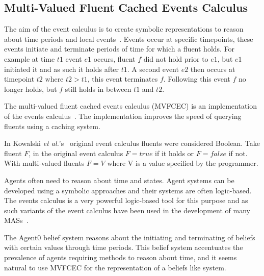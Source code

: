 \documentclass[]{final_report}
\begin{document}
\subsection{Multi-Valued Fluent Cached Events Calculus}
The aim of the event calculus is to create symbolic representations to reason about time periods and local events~\cite{kowalski1989logic}. Events occur at specific timepoints, these events initiate and terminate periods of time for which a fluent holds. For example at time $t1$ event $e1$ occurs, fluent $f$ did not hold prior to $e1$, but $e1$ initiated it and as such it holds after $t1$. A second event $e2$ then occurs at timepoint $t2$ where $t2>t1$, this event terminates $f$. Following this event $f$ no longer holds, but $f$ still holds in between $t1$ and $t2$.\par
The multi-valued fluent cached events calculus (MVFCEC) is an implementation of the events calculus~\cite{mvfcec}. The implementation improves the speed of querying fluents using a caching system.\par 
In Kowalski \textit{et al.}'s~\cite{kowalski1989logic} original event calculus fluents were considered Boolean. Take fluent $F$, in the original event calculus $F=true$ if it holds or $F=false$ if not. With multi-valued fluents $F=V$ where V is a value specified by the programmer.\par 
Agents often need to reason about time and states. Agent systems can be developed using a symbolic approaches and their systems are often logic-based. The events calculus is a very powerful logic-based tool for this purpose and as such variants of the event calculus have been used in the development of many MASs~\cite{artikis2009specifying, mvfcec}.\par 
The Agent0 belief system reasons about the initiating and terminating of beliefs with certain values through time periods. This belief system accentuates the prevalence of agents requiring methods to reason about time, and it seems natural to use MVFCEC for the representation of a beliefs like system.
\end{document}

